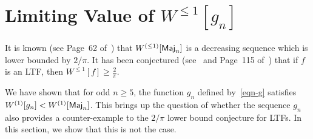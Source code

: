 \documentclass[11pt]{article}
\newtheorem{remark}{Remark}
\newcommand{\sym}[1]{{\sf #1}}
\begin{document}
%
%

\section{Limiting Value of ${W}^{\leq 1}[g_n]$}
It is known (see Page~62 of~\cite{o2014analysis}) that ${W}^{(\leq 1)}[\sym{Maj}_n]$ is a decreasing sequence which is lower bounded by $2/\pi$.
It has been conjectured (see~\cite{benjamini1999noise} and Page~115 of~\cite{o2014analysis}) that if $f$ is an LTF, then ${W}^{\leq 1}[f] \geq \frac{2}{\pi}$.

We have shown that for odd $n\geq 5$, the function $g_n$ defined by~\eqref{eqn-g} satisfies ${W}^{(1)}[g_n]<{W}^{(1)}[\sym{Maj}_n]$. This brings
up the question of whether the sequence $g_n$ also provides a counter-example to the $2/\pi$ lower bound conjecture for LTFs. In this section, we show that this is not the
case.
\end{document}
